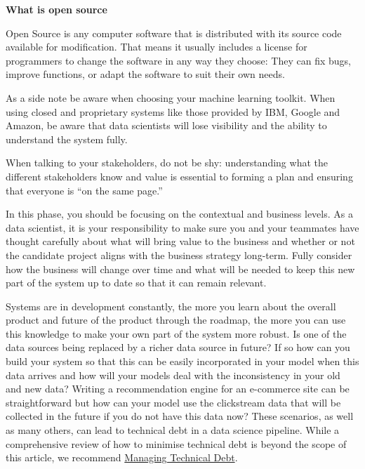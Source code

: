 \documentclass[
]{book}
\begin{document}
\begin{infobox}

\textbf{What is open source}

Open Source is any computer software that is distributed with its source code available for modification. That means it usually includes a license for programmers to change the software in any way they choose: They can fix bugs, improve functions, or adapt the software to suit their own needs.

\end{infobox}

As a side note be aware when choosing your machine learning toolkit. When using closed and proprietary systems like those provided by IBM, Google and Amazon, be aware that data scientists will lose visibility and the ability to understand the system fully.

When talking to your stakeholders, do not be shy: understanding what the different stakeholders know and value is essential to forming a plan and ensuring that everyone is ``on the same page.''

In this phase, you should be focusing on the contextual and business levels. As a data scientist, it is your responsibility to make sure you and your teammates have thought carefully about what will bring value to the business and whether or not the candidate project aligns with the business strategy long-term. Fully consider how the business will change over time and what will be needed to keep this new part of the system up to date so that it can remain relevant.

Systems are in development constantly, the more you learn about the overall product and future of the product through the roadmap, the more you can use this knowledge to make your own part of the system more robust. Is one of the data sources being replaced by a richer data source in future? If so how can you build your system so that this can be easily incorporated in your model when this data arrives and how will your models deal with the inconsistency in your old and new data? Writing a recommendation engine for an e-commerce site can be straightforward but how can your model use the clickstream data that will be collected in the future if you do not have this data now? These scenarios, as well as many others, can lead to technical debt in a data science pipeline. While a comprehensive review of how to minimise technical debt is beyond the scope of this article, we recommend \href{https://www.amazon.com/Managing-Technical-Debt-Development-Engineering/dp/013564593X}{Managing Technical Debt}.
\end{document}
